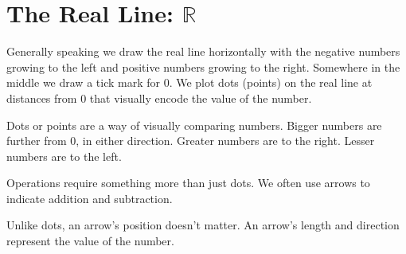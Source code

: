 \documentclass{ximera}
\begin{document}
\section{The Real Line:  $\mathbb{R}$}





Generally speaking we draw the real line horizontally with the negative numbers growing to the left and positive numbers growing to the right. Somewhere in the middle we draw a tick mark for $0$. We plot dots (points) on the real line at distances from $0$ that visually encode the value of the number.












  \begin{image}
  \end{image}


Dots or points are a way of visually comparing numbers.  Bigger numbers are further from $0$, in either direction.  Greater numbers are to the right.  Lesser numbers are to the left.




Operations require something more than just dots. We often use arrows to indicate addition and subtraction.

Unlike dots, an arrow's position doesn't matter. An arrow's length and direction represent the value of the number.
\end{document}
